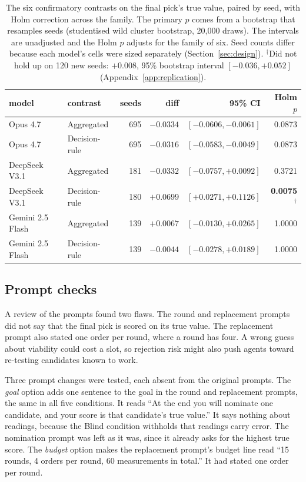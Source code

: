 \begin{table}[tbp]
\centering
\small
\caption{The six confirmatory contrasts on the final pick's true value, paired by seed, with Holm correction
across the family. The primary $p$ comes from a bootstrap that resamples seeds (studentised wild cluster bootstrap, 20{,}000 draws). The intervals are unadjusted and the Holm $p$ adjusts for the family of six. Seed
counts differ because each model's cells were sized separately (Section~\ref{sec:design}). $^\dagger$Did not hold up on 120 new seeds: $+0.008$, 95\% bootstrap interval $[-0.036, +0.052]$
(Appendix~\ref{app:replication}).}
\label{tab:confirm}
\begin{tabular}{llrrrr}
\toprule
model & contrast & seeds & diff & 95\% CI & Holm $p$ \\
\midrule
Opus 4.7     & Aggregated    & 695 & $-0.0334$ & $[-0.0606, -0.0061]$ & 0.0873 \\
Opus 4.7     & Decision-rule & 695 & $-0.0316$ & $[-0.0583, -0.0049]$ & 0.0873 \\
DeepSeek V3.1& Aggregated    & 181 & $-0.0332$ & $[-0.0757, +0.0092]$ & 0.3721 \\
DeepSeek V3.1& Decision-rule & 180 & $+0.0699$ & $[+0.0271, +0.1126]$ & \textbf{0.0075}$^\dagger$ \\
Gemini 2.5 Flash & Aggregated    & 139 & $+0.0067$ & $[-0.0130, +0.0265]$ & 1.0000 \\
Gemini 2.5 Flash & Decision-rule & 139 & $-0.0044$ & $[-0.0278, +0.0189]$ & 1.0000 \\
\bottomrule
\end{tabular}
\end{table}

\subsection{Prompt checks}
\label{sec:prompt}
\label{app:prompt}

A review of the prompts found two flaws. The round and replacement prompts did not say that the final pick is
scored on its true value. The replacement prompt also stated one order per round, where a round has four. A
wrong guess about viability could cost a slot, so rejection risk might also push agents toward re-testing
candidates known to work.

Three prompt changes were tested, each absent from the original prompts. The \emph{goal} option adds one sentence to the goal in the round and replacement prompts, the same in all five conditions. It reads ``At the
end you will nominate one candidate, and your score is that candidate's true value.'' It says nothing about
readings, because the Blind condition withholds that readings carry error. The nomination prompt was left as it
was, since it already asks for the highest true score. The \emph{budget} option makes the replacement prompt's budget line
read ``15 rounds, 4 orders per round, 60 measurements in total.'' It had stated one order per round.

